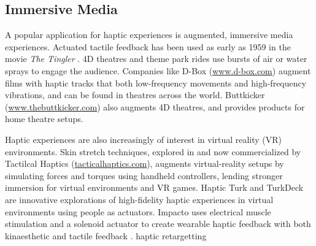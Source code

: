 

\subsection{Immersive Media}
A popular application for haptic experiences is augmented, immersive media experiences.
Actuated tactile feedback has been used as early as 1959 in the movie \emph{The Tingler}  \cite{IJsselsteijn2003}.
4D theatres and theme park rides use bursts of air or water sprays to engage the audience.
Companies like D-Box (\url{www.d-box.com}) augment films with haptic tracks that both low-frequency movements and high-frequency vibrations, and can be found in theatres across the world.
Buttkicker (\url{www.thebuttkicker.com}) also augments 4D theatres, and provides products for home theatre setups.

Haptic experiences are also increasingly of interest in virtual reality (VR) environments.
Skin stretch techniques, explored in \cite{Guinan2014} and now commercialized by Tactilcal Haptics (\url{tacticalhaptics.com}), augments virtual-reality setups by simulating forces and torques using handheld controllers, lending stronger immersion for virtual environments and VR games.
Haptic Turk \cite{Cheng2014} and TurkDeck \cite{Cheng2015} are innovative explorations of high-fidelity haptic experiences in virtual environments using people as actuators.
Impacto uses electrical muscle stimulation and a solenoid actuator to create wearable haptic feedback with both kinaesthetic and tactile feedback \cite{Lopes2015}.
haptic retargetting \cite{Azmandian2016}

